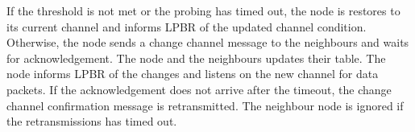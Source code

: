 If the threshold is not met or the probing has timed out, the node is restores to its current channel and informs LPBR of the updated channel condition. Otherwise, the node sends a change channel message to the neighbours and waits for acknowledgement. The node and the neighbours updates their table. The node informs LPBR of the changes and listens on the new channel for data packets. If the acknowledgement does not arrive after the timeout, the change channel confirmation message is retransmitted. The neighbour node is ignored if the retransmissions has timed out. 




